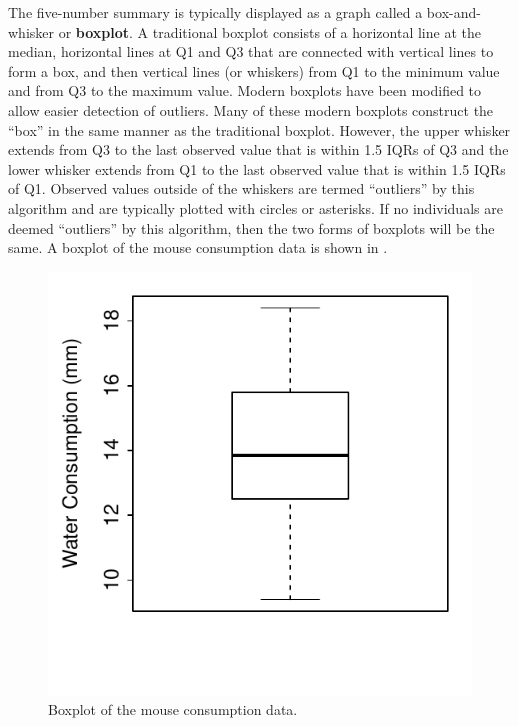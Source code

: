 \documentclass[10pt,openany]{book}\usepackage[]{graphicx}\usepackage[]{color}
\newenvironment{knitrout}{}{} %
\begin{document}
The five-number summary is typically displayed as a graph called a box-and-whisker or \textbf{boxplot}.  A traditional boxplot consists of a horizontal line at the median, horizontal lines at Q1 and Q3 that are connected with vertical lines to form a box, and then vertical lines (or whiskers) from Q1 to the minimum value and from Q3 to the maximum value.  Modern boxplots have been modified to allow easier detection of outliers.  Many of these modern boxplots construct the ``box'' in the same manner as the traditional boxplot.  However, the upper whisker extends from Q3 to the last observed value that is within 1.5 IQRs of Q3 and the lower whisker extends from Q1 to the last observed value that is within 1.5 IQRs of Q1.  Observed values outside of the whiskers are termed ``outliers'' by this algorithm and are typically plotted with circles or asterisks.  If no individuals are deemed ``outliers'' by this algorithm, then the two forms of boxplots will be the same.  A boxplot of the mouse consumption data is shown in .

\begin{knitrout}
\color{fgcolor}\begin{figure}[hbtp]

{\centering \includegraphics[width=.4\linewidth]{Figs/MouseBoxplot-1} 

}

\caption[Boxplot of the mouse consumption data]{Boxplot of the mouse consumption data.}\label{fig:MouseBoxplot}
\end{figure}


\end{knitrout}

\end{document}
